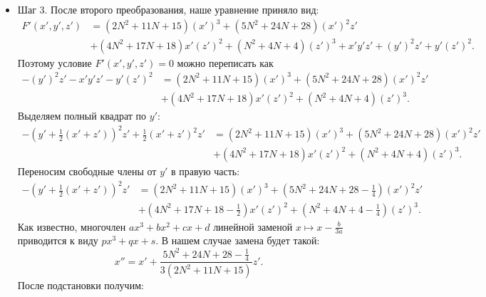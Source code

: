 \begin{itemize}[leftmargin=0.6cm]
    \item Шаг 3. После второго преобразования, наше уравнение приняло вид:
    \begin{align*}
        F'(x', y', z') &= \left(2 N^2 + 11 N + 15\right) \left( x' \right)^3
        + \left(5 N^2 + 24 N + 28\right) \left( x' \right)^2 z' \\ &+ \left(4 N^2
        + 17 N + 18\right) x' \left( z' \right)^2 + \left(N^2 + 4 N +
        4\right) \left( z' \right)^3  + x' y' z' + \left( y' \right)^2 z' + y'
        \left( z' \right)^2 
    .\end{align*}
    Поэтому условие \(F'(x', y', z') = 0\) можно переписать как 
    \begin{align*}
       -\left( y' \right)^2 z' - x' y' z' - y'
        \left( z' \right)^2 &= \left(2 N^2 + 11 N + 15\right) \left( x' \right)^3
        + \left(5 N^2 + 24 N + 28\right) \left( x' \right)^2 z' \\ &+ \left(4 N^2
        + 17 N + 18\right) x' \left( z' \right)^2 + \left(N^2 + 4 N +
        4\right) \left( z' \right)^3
    .\end{align*}
    Выделяем полный квадрат по \(y'\):
    \begin{align*}
       -\left( y' + \frac{1}{2}(x' + z')  \right)^2 z' + \frac{1}{2} (x' +
       z')^2 z' &= \left(2 N^2 + 11 N + 15\right) \left( x' \right)^3
        + \left(5 N^2 + 24 N + 28\right) \left( x' \right)^2 z' \\ &+ \left(4 N^2
        + 17 N + 18\right) x' \left( z' \right)^2 + \left(N^2 + 4 N +
        4\right) \left( z' \right)^3
    .\end{align*}
    Переносим свободные члены от \(y'\) в правую часть:
    \begin{align*}
       -\left( y' + \frac{1}{2}(x' + z')  \right)^2 z' &= \left(2 N^2 + 11 N + 15\right) \left( x' \right)^3
        + \left(5 N^2 + 24 N + 28 - \frac{1}{4} \right) \left( x' \right)^2 z' \\ &+ \left(4 N^2
        + 17 N + 18 - \frac{1}{2} \right) x' \left( z' \right)^2 + \left(N^2 + 4 N +
        4 - \frac{1}{4} \right) \left( z' \right)^3
    .\end{align*}
    Как известно, многочлен \(a x^3 + b x^2 + c x + d\) линейной заменой \(x
    \mapsto x - \frac{b}{3 a}\)
    приводится к виду \(p x^3 + q x + s\). В нашем
    случае замена будет такой:
    \[
    x'' = x' + \frac{5 N^2 + 24 N + 28 - \frac{1}{4}}{3(2 N^2 + 11 N + 15)}
    z'
    .\] 
    После подстановки получим:
    \begin{align*}

\end{align*}
\end{itemize}
